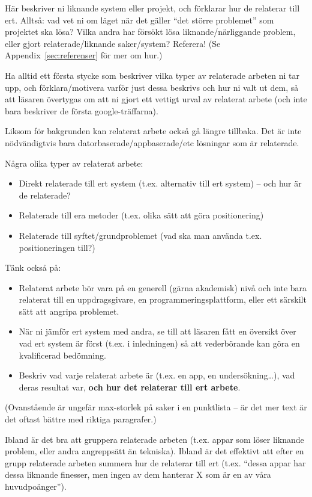 Här beskriver ni liknande system eller projekt, och förklarar hur de relaterar till ert.  Alltså: vad vet ni om läget när det gäller ``det större problemet'' som projektet ska lösa?  Vilka andra har försökt lösa liknande/närliggande problem, eller gjort relaterade/liknande saker/system? Referera! (Se Appendix~\ref{sec:referenser} för mer om hur.)

Ha alltid ett första stycke som beskriver vilka typer av relaterade arbeten ni tar upp, och förklara/motivera varför just dessa beskrivs och hur ni valt ut dem, så att läsaren övertygas om att ni gjort ett vettigt urval av relaterat arbete (och inte bara beskriver de första google-träffarna). 

Liksom för bakgrunden kan relaterat arbete också gå längre tillbaka. Det är inte nöd\-vän\-digt\-vis bara datorbaserade/appbaserade/etc lösningar som är relaterade.

Några olika typer av relaterat arbete:
\begin{itemize}
\item Direkt relaterade till ert system (t.ex. alternativ till ert system) – och hur är de relaterade?
\item Relaterade till era metoder (t.ex. olika sätt att göra positionering)
\item Relaterade till syftet/grundproblemet (vad ska man använda t.ex. positioneringen till?)
\end{itemize}

Tänk också på:

\begin{itemize}
\item 
  Relaterat arbete bör vara på en generell (gärna akademisk) nivå och inte bara relaterat till en uppdragsgivare, en programmeringsplattform, eller ett särskilt sätt att angripa problemet.
\item 
  När ni jämför ert system med andra, se till att läsaren fått en översikt över vad ert system är först (t.ex. i inledningen) så att vederbörande kan göra en kvalificerad bedömning.
\item
 Beskriv vad varje relaterat arbete är (t.ex. en app, en undersökning\ldots), vad deras resultat var, \textbf{och hur det relaterar till ert arbete}.
\end{itemize}

(Ovanstående är ungefär max-storlek på saker i en punktlista -- är det mer text är det oftast bättre med riktiga paragrafer.)

Ibland är det bra att gruppera relaterade arbeten (t.ex. appar som löser liknande problem, eller andra angreppsätt än tekniska).
Ibland är det effektivt att efter en grupp relaterade arbeten summera hur de relaterar till ert (t.ex. ``dessa appar har dessa liknande finesser, men ingen av dem hanterar X som är en av våra huvudpoänger'').



